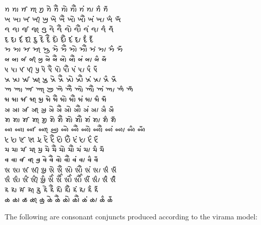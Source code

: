 \documentclass[12pt]{article}
\begin{document}
{𑈙 𑈙𑈬 𑈙𑈭 𑈙𑈮 𑈙𑈯 𑈙𑈰 𑈙𑈱 𑈙𑈲 𑈙𑈳 𑈙𑈴 𑈙𑈵 𑈙𑈶 𑈙𑈷 \\ 

𑈚 𑈚𑈬 𑈚𑈭 𑈚𑈮 𑈚𑈯 𑈚𑈰 𑈚𑈱 𑈚𑈲 𑈚𑈳 𑈚𑈴 𑈚𑈵 𑈚𑈶 𑈚𑈷 \\ 

𑈛 𑈛𑈬 𑈛𑈭 𑈛𑈮 𑈛𑈯 𑈛𑈰 𑈛𑈱 𑈛𑈲 𑈛𑈳 𑈛𑈴 𑈛𑈵 𑈛𑈶 𑈛𑈷 \\ 

𑈜 𑈜𑈬 𑈜𑈭 𑈜𑈮 𑈜𑈯 𑈜𑈰 𑈜𑈱 𑈜𑈲 𑈜𑈳 𑈜𑈴 𑈜𑈵 𑈜𑈶 𑈜𑈷 \\ 

𑈝 𑈝𑈬 𑈝𑈭 𑈝𑈮 𑈝𑈯 𑈝𑈰 𑈝𑈱 𑈝𑈲 𑈝𑈳 𑈝𑈴 𑈝𑈵 𑈝𑈶 𑈝𑈷 \\ 

𑈞 𑈞𑈬 𑈞𑈭 𑈞𑈮 𑈞𑈯 𑈞𑈰 𑈞𑈱 𑈞𑈲 𑈞𑈳 𑈞𑈴 𑈞𑈵 𑈞𑈶 𑈞𑈷 \\ 

𑈟 𑈟𑈬 𑈟𑈭 𑈟𑈮 𑈟𑈯 𑈟𑈰 𑈟𑈱 𑈟𑈲 𑈟𑈳 𑈟𑈴 𑈟𑈵 𑈟𑈶 𑈟𑈷 \\ 

𑈠 𑈠𑈬 𑈠𑈭 𑈠𑈮 𑈠𑈯 𑈠𑈰 𑈠𑈱 𑈠𑈲 𑈠𑈳 𑈠𑈴 𑈠𑈵 𑈠𑈶 𑈠𑈷 \\ 

𑈡 𑈡𑈬 𑈡𑈭 𑈡𑈮 𑈡𑈯 𑈡𑈰 𑈡𑈱 𑈡𑈲 𑈡𑈳 𑈡𑈴 𑈡𑈵 𑈡𑈶 𑈡𑈷 \\ 

𑈢 𑈢𑈬 𑈢𑈭 𑈢𑈮 𑈢𑈯 𑈢𑈰 𑈢𑈱 𑈢𑈲 𑈢𑈳 𑈢𑈴 𑈢𑈵 𑈢𑈶 𑈢𑈷 \\ 

𑈣 𑈣𑈬 𑈣𑈭 𑈣𑈮 𑈣𑈯 𑈣𑈰 𑈣𑈱 𑈣𑈲 𑈣𑈳 𑈣𑈴 𑈣𑈵 𑈣𑈶 𑈣𑈷 \\ 

𑈤 𑈤𑈬 𑈤𑈭 𑈤𑈮 𑈤𑈯 𑈤𑈰 𑈤𑈱 𑈤𑈲 𑈤𑈳 𑈤𑈴 𑈤𑈵 𑈤𑈶 𑈤𑈷 \\ 

𑈥 𑈥𑈬 𑈥𑈭 𑈥𑈮 𑈥𑈯 𑈥𑈰 𑈥𑈱 𑈥𑈲 𑈥𑈳 𑈥𑈴 𑈥𑈵 𑈥𑈶 𑈥𑈷 \\ 

𑈦 𑈦𑈬 𑈦𑈭 𑈦𑈮 𑈦𑈯 𑈦𑈰 𑈦𑈱 𑈦𑈲 𑈦𑈳 𑈦𑈴 𑈦𑈵 𑈦𑈶 𑈦𑈷 \\ 

𑈧 𑈧𑈬 𑈧𑈭 𑈧𑈮 𑈧𑈯 𑈧𑈰 𑈧𑈱 𑈧𑈲 𑈧𑈳 𑈧𑈴 𑈧𑈵 𑈧𑈶 𑈧𑈷 \\ 

𑈨 𑈨𑈬 𑈨𑈭 𑈨𑈮 𑈨𑈯 𑈨𑈰 𑈨𑈱 𑈨𑈲 𑈨𑈳 𑈨𑈴 𑈨𑈵 𑈨𑈶 𑈨𑈷 \\ 

𑈩 𑈩𑈬 𑈩𑈭 𑈩𑈮 𑈩𑈯 𑈩𑈰 𑈩𑈱 𑈩𑈲 𑈩𑈳 𑈩𑈴 𑈩𑈵 𑈩𑈶 𑈩𑈷 \\ 

𑈩𑈶 𑈩𑈶𑈬 𑈩𑈶𑈭 𑈩𑈶𑈮 𑈩𑈶𑈯 𑈩𑈶𑈰 𑈩𑈶𑈱 𑈩𑈶𑈲 𑈩𑈶𑈳 𑈩𑈶𑈴 𑈩𑈶𑈵 𑈩𑈶𑈶 𑈩𑈷𑈶 \\ 

𑈪 𑈪𑈬 𑈪𑈭 𑈪𑈮 𑈪𑈯 𑈪𑈰 𑈪𑈱 𑈪𑈲 𑈪𑈳 𑈪𑈴 𑈪𑈵 𑈪𑈶 𑈪𑈷 \\ 

𑈫 𑈫𑈬 𑈫𑈭 𑈫𑈮 𑈫𑈯 𑈫𑈰 𑈫𑈱 𑈫𑈲 𑈫𑈳 𑈫𑈴 𑈫𑈵 𑈫𑈶 𑈫𑈷 \\ 
}
\bigskip


The following are consonant conjuncts produced according to the 
virama model:
\bigskip
\end{document}
